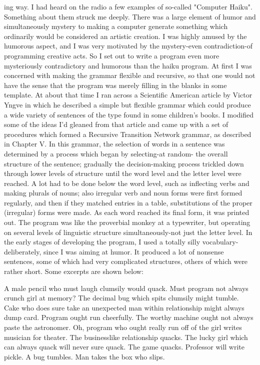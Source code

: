 {ing way. I had heard on the radio a few examples of so-called "Computer Haiku".
Something about them struck me deeply. There was a large element of humor and
simultaneously mystery to making a computer generate something which ordinarily
would be considered an artistic creation. I was highly amused by the humorous aspect,
and I was very motivated by the mystery-even contradiction-of programming creative
acts. So I set out to write a program even more mysteriously contradictory and humorous
than the haiku program.
        At first I was concerned with making the grammar flexible and recursive, so that
one would not have the sense that the program was merely filling in the blanks in some
template. At about that time I ran across a Scientific American article by Victor Yngve in
which he described a simple but flexible grammar which could produce a wide variety of
sentences of the type found in some children's books. I modified some of the ideas I'd
gleaned from that article and came up with a set of procedures which formed a Recursive
Transition Network grammar, as described in Chapter V. In this grammar, the selection
of words in a sentence was determined by a process which began by selecting-at random-
the overall structure of the sentence; gradually the decision-making process trickled down
through lower levels of structure until the word level and the letter level were reached. A
lot had to be done below the word level, such as inflecting verbs and making plurals of
nouns; also irregular verb and noun forms were first formed regularly, and then if they
matched entries in a table, substitutions of the proper (irregular) forms were made. As
each word reached its final form, it was printed out. The program was like the proverbial
monkey at a typewriter, but operating on several levels of linguistic structure
simultaneously-not just the letter level.
        In the early stages of developing the program, I used a totally silly vocabulary-
deliberately, since I was aiming at humor. It produced a lot of nonsense sentences, some
of which had very complicated structures, others of which were rather short. Some
excerpts are shown below:

       A male pencil who must laugh clumsily would quack. Must program not
   always crunch girl at memory? The decimal bug which spits clumsily might
   tumble. Cake who does sure take an unexpected man within relationship might
   always dump card.
   Program ought run cheerfully.
   The worthy machine ought not always paste the astronomer.
       Oh, program who ought really run off of the girl writes musician for theater.
   The businesslike relationship quacks.
   The lucky girl which can always quack will never sure quack.
   The game quacks. Professor will write pickle. A bug tumbles. Man takes the box
   who slips.

}
